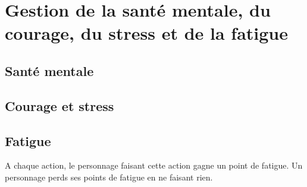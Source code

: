 \section{Gestion de la santé mentale, du courage, du stress et de la fatigue}
\subsection{Santé mentale}
\subsection{Courage et stress}
\subsection{Fatigue}
A chaque action, le personnage faisant cette action gagne un point de fatigue.
Un personnage perds ses points de fatigue en ne faisant rien.
